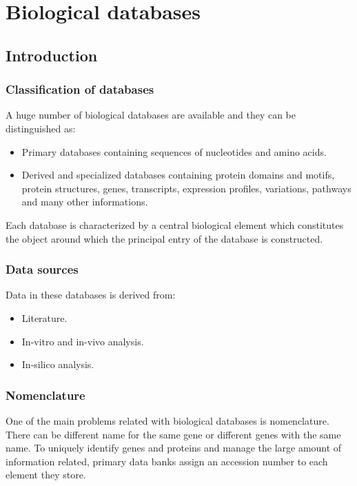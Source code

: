 \graphicspath{{chapters/03/images}}
\chapter{Biological databases}

\section{Introduction}

	\subsection{Classification of databases}
	A huge number of biological databases are available and they can be distinguished as:

	\begin{multicols}{2}
		\begin{itemize}
			\item Primary databases containing sequences of nucleotides and amino acids.
			\item Derived and specialized databases containing protein domains and motifs, protein structures, genes, transcripts, expression profiles, variations, pathways and many other informations.
		\end{itemize}
	\end{multicols}

	Each database is characterized by a central biological element which constitutes the object around which the principal entry of the database is constructed.

	\subsection{Data sources}
	Data in these databases is derived from:

	\begin{multicols}{3}
		\begin{itemize}
			\item Literature.
			\item In-vitro and in-vivo analysis.
			\item In-silico analysis.
		\end{itemize}
	\end{multicols}

	\subsection{Nomenclature}
	One of the main problems related with biological databases is nomenclature.
	There can be different name for the same gene or different genes with the same name.
	To uniquely identify genes and proteins and manage the large amount of information related, primary data banks assign an accession number to each element they store.

